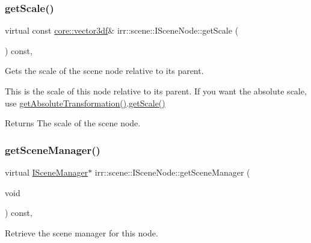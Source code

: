 \subsubsection{\texorpdfstring{get\+Scale()}{getScale()}\hspace{0.1cm}{\footnotesize\ttfamily [2/2]}}
{\footnotesize\ttfamily virtual const \hyperlink{namespaceirr_1_1core_ae6e2b2a6c552833ebbd5b7463d03586b}{core\+::vector3df}\& irr\+::scene\+::\+I\+Scene\+Node\+::get\+Scale (\begin{DoxyParamCaption}{ }\end{DoxyParamCaption}) const\hspace{0.3cm}{\ttfamily [inline]}, {\ttfamily [virtual]}}



Gets the scale of the scene node relative to its parent. 

This is the scale of this node relative to its parent. If you want the absolute scale, use \hyperlink{classirr_1_1scene_1_1ISceneNode_af13dc546a7be796cc0868a2eec51e508}{get\+Absolute\+Transformation()}.\hyperlink{classirr_1_1scene_1_1ISceneNode_a97a5963f8b7b3cdf6fa196863c641c1d}{get\+Scale()} \begin{DoxyReturn}{Returns}
The scale of the scene node. 
\end{DoxyReturn}
\mbox{\label{classirr_1_1scene_1_1ISceneNode_a394f112e9b4a1c66f7d58e873a3f8a1d}} 
\subsubsection{\texorpdfstring{get\+Scene\+Manager()}{getSceneManager()}\hspace{0.1cm}{\footnotesize\ttfamily [1/2]}}
{\footnotesize\ttfamily virtual \hyperlink{classirr_1_1scene_1_1ISceneManager}{I\+Scene\+Manager}$\ast$ irr\+::scene\+::\+I\+Scene\+Node\+::get\+Scene\+Manager (\begin{DoxyParamCaption}\item[{void}]{ }\end{DoxyParamCaption}) const\hspace{0.3cm}{\ttfamily [inline]}, {\ttfamily [virtual]}}



Retrieve the scene manager for this node. 

